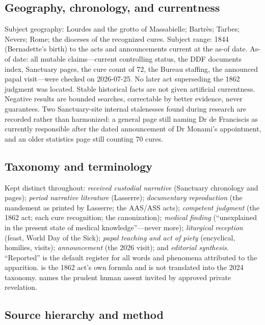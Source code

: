 \subsection*{Geography, chronology, and currentness}

Subject geography: Lourdes and the grotto of Massabielle;
Bartr\`es; Tarbes; Nevers; Rome; the dioceses of the recognized
cures. Subject range: 1844 (Bernadette's birth) to the acts and
announcements current at the as-of date. As-of date: all mutable
claims---current controlling status, the DDF documents index,
Sanctuary pages, the cure count of 72, the Bureau staffing, the
announced papal visit---were checked on 2026-07-25. No later act
superseding the 1862 judgment was located. Stable historical
facts are not given artificial currentness. Negative results are
bounded searches, correctable by better evidence, never
guarantees. Two Sanctuary-site internal stalenesses found during
research are recorded rather than harmonized: a general page
still naming Dr de Franciscis as currently responsible after the
dated announcement of Dr Monami's appointment, and an older
statistics page still counting 70 cures.

\subsection*{Taxonomy and terminology}

Kept distinct throughout: \emph{received custodial narrative}
(Sanctuary chronology and pages); \emph{period narrative
literature} (Lasserre); \emph{documentary reproduction} (the
mandement as printed by Lasserre; the AAS/ASS acts);
\emph{competent judgment} (the 1862 act; each cure recognition;
the canonization); \emph{medical finding} (``unexplained in the
present state of medical knowledge''---never more);
\emph{liturgical reception} (feast, World Day of the Sick);
\emph{papal teaching and act of piety} (encyclical, homilies,
visits); \emph{announcement} (the 2026 visit); and
\emph{editorial synthesis}. ``Reported'' is the default register
for all words and phenomena attributed to the apparition.
 is the 1862 act's own
formula and is not translated into the 2024 taxonomy.
 names the prudent human assent invited by
approved private revelation.

\subsection*{Source hierarchy and method}

